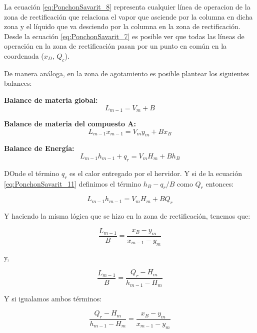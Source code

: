 \documentclass[11pt]{book}
\begin{document}
La ecuación \ref{eq:PonchonSavarit_8} representa cualquier línea de operacion de la zona de rectificación que relaciona el vapor que asciende por la columna en dicha zona y el líquido que va desciendo por la columna en la zona de rectificación. Desde la ecuación \ref{eq:PonchonSavarit_7} es posible ver que todas las líneas de operación en la zona de rectificación pasan por un punto en común en la coordenada ($x_D$, $Q_c$).

De manera análoga, en la zona de agotamiento es posible plantear los siguientes balances:

\textbf{Balance de materia global:}
\begin{equation}
    \label{eq:PonchonSavarit_9}
    L_{m-1} = V_m + B
\end{equation}

\textbf{Balance de materia del compuesto A:}
\begin{equation}
    \label{eq:PonchonSavarit_10}
    L_{m-1}x_{m-1}= V_m y_m + B x_B
\end{equation}

\textbf{Balance de Energía:}
\begin{equation}
    \label{eq:PonchonSavarit_11}
    L_{m-1} h_{m-1} + q_r= V_m H_m + B h_B
\end{equation}

DOnde el término $q_r$ es el calor entregado por el hervidor. Y si de la ecuación \ref{eq:PonchonSavarit_11} definimos el término $h_B - q_r/B$ como $Q_r$ entonces:

\begin{equation}
    \label{eq:PonchonSavarit_12}
    L_{m-1} h_{m-1}= V_m H_m + B Q_r
\end{equation}

Y haciendo la misma lógica que se hizo en la zona de rectificación, tenemos que:

\begin{equation}
    \label{eq:PonchonSavarit_13}
    \frac{L_{m-1}}{B} = \frac{x_B-y_m}{x_{m-1} - y_m}
\end{equation}

y,

\begin{equation}
    \label{eq:PonchonSavarit_14}
    \frac{L_{m-1}}{B} = \frac{Q_r - H_m}{h_{m-1} - H_m}
\end{equation}

Y si igualamos ambos términos:

\begin{equation}
    \label{eq:PonchonSavarit_15}
    \frac{Q_r - H_m}{h_{m-1} - H_m} = \frac{x_B-y_m}{x_{m-1} - y_m}
\end{equation}
\end{document}
